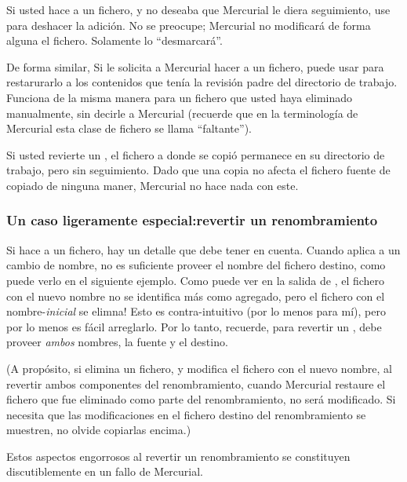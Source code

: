 Si usted hace  a un fichero, y no deseaba que Mercurial le
diera seguimiento, use  para deshacer la adición.  No se
preocupe; Mercurial no modificará de forma alguna el fichero.
Solamente lo ``desmarcará''.

De forma similar, Si le solicita a Mercurial hacer  a un
fichero, puede usar  para restarurarlo a los contenidos
que tenía la revisión padre del directorio de trabajo.
Funciona de la misma manera para un fichero que usted haya eliminado
manualmente, sin decirle a Mercurial (recuerde que en la terminología
de Mercurial esta clase de fichero se llama ``faltante'').

Si usted revierte un , el fichero a donde se copió
permanece en su directorio de trabajo, pero sin seguimiento. Dado que
una copia no afecta el fichero fuente de copiado de ninguna maner,
Mercurial no hace nada con este.

\subsubsection{Un caso ligeramente especial:revertir un renombramiento}

Si hace  a un fichero, hay un detalle que debe tener en
cuenta. Cuando aplica  a un cambio de nombre, no es
suficiente proveer el nombre del fichero destino, como puede verlo en
el siguiente ejemplo.
Como puede ver en la salida de , el fichero con el nuevo
nombre no se identifica más como agregado, pero el fichero con el
nombre-\emph{inicial} se elimna!  Esto es contra-intuitivo (por lo
menos para mí), pero por lo menos es fácil arreglarlo.
Por lo tanto, recuerde, para revertir un , debe proveer
\emph{ambos} nombres, la fuente y el destino.


(A propósito, si elimina un fichero, y modifica el fichero con el
nuevo nombre, al revertir ambos componentes del renombramiento, cuando
Mercurial restaure el fichero que fue eliminado como parte del
renombramiento, no será modificado.
Si necesita que las modificaciones en el fichero destino del
renombramiento se muestren, no olvide copiarlas encima.)

Estos aspectos engorrosos al revertir un renombramiento se constituyen
discutiblemente en un fallo de Mercurial.

